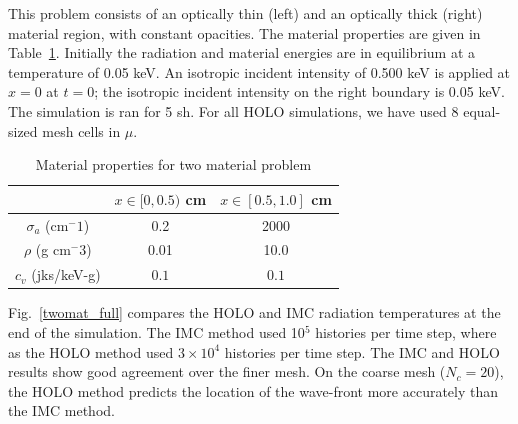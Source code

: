 \documentclass{mc2013}
\begin{document}

This problem consists of an optically thin (left) and an optically thick (right) material region,
with constant opacities.  The material properties are given in
Table~\ref{two_mat_props}.  Initially the radiation and material energies are in
equilibrium at a temperature of 0.05 keV.  An isotropic incident intensity of 0.500 keV
is applied at $x=0$ at $t=0$; the isotropic incident intensity on the right boundary is 0.05
keV.  The simulation is ran for 5 sh. For all HOLO simulations, we have used 8 equal-sized mesh cells in $\mu$.
\begin{table}[H]
        \caption{Material properties for two material problem\label{two_mat_props}}
\centering
        \begin{tabular}{|c|cc|}  \cline{2-3}
            \multicolumn{1}{c|}{}   & $x \in [0,0.5)$ cm & $x \in [0.5,1.0]$ cm   \\ \hline
            $\sigma_a$ (cm$^-1$)  & 0.2 & 2000 \\
            $\rho$ (g cm$^-3$) & 0.01 & 10.0 \\
            $c_v$ (jks/keV-g) & $0.1$ & $0.1$ \\ \hline
        \end{tabular}
\end{table}
Fig.~\ref{twomat_full} compares the HOLO and IMC radiation 
temperatures at the end of the simulation. The IMC method used 10$^5$ histories per
time step, where as the HOLO method used $3\times10^4$ histories per time step.  The
IMC and HOLO results show good agreement
over the finer mesh.
On the coarse mesh ($N_c=20$), the HOLO method predicts the location of the
wave-front more accurately than the IMC method. 
\end{document}
